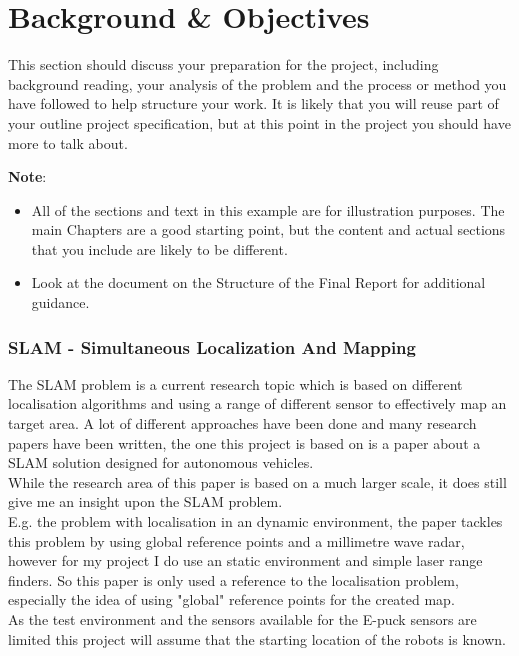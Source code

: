 \chapter{Background \& Objectives}

This section should discuss your preparation for the project, including background reading, your analysis of the problem and the process or method you have followed to help structure your work.  It is likely that you will reuse part of your outline project specification, but at this point in the project you should have more to talk about. 

\textbf{Note}: 

\begin{itemize}
   \item All of the sections and text in this example are for illustration purposes. The main Chapters are a good starting point, but the content and actual sections that you include are likely to be different.
   
   \item Look at the document on the Structure of the Final Report for additional guidance. 
   
\end {itemize}

\subsection{SLAM - Simultaneous Localization And Mapping}
The SLAM problem is a current research topic which is based on different localisation algorithms and using a range of different sensor to effectively map an target area. A lot of different approaches have been done and many research papers have been written, the one this project is based on is a paper about a SLAM solution designed for autonomous vehicles\cite{Dissanayake2001Solution}.\\
While the research area of this paper is based on a much larger scale, it does still give me an insight upon the SLAM problem.\\
E.g. the problem with localisation in an dynamic environment, the paper tackles this problem by using global reference points and a millimetre wave radar, however for my project I do use an static environment and simple laser range finders. So this paper is only used a reference to the localisation problem, especially the idea of using "global" reference points for the created map.\\
As the test environment and the sensors available for the E-puck sensors are limited this project will assume that the starting location of the robots is known.\\[3ex]


